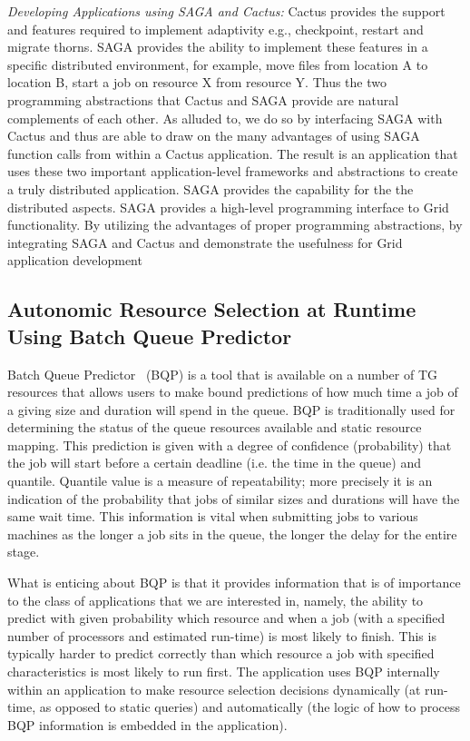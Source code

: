 \documentclass{sig-alternate}
\newcommand{\up}{\vspace*{-0.3em}}
\begin{document}
{\it Developing Applications using SAGA and Cactus:} Cactus provides
the support and features required to implement adaptivity e.g.,
checkpoint, restart and migrate thorns. SAGA provides the ability to
implement these features in a specific distributed environment, for
example, move files from location A to location B, start a job on
resource X from resource Y.  Thus the two programming abstractions
that Cactus and SAGA provide are natural complements of each other.
As alluded to, we do so by interfacing SAGA with Cactus and thus are
able to draw on the many advantages of using SAGA function calls from
within a Cactus application.  The result is an application that uses
these two important application-level frameworks and abstractions to
create a truly distributed application.  SAGA provides the capability
for the the distributed aspects. SAGA provides a high-level
programming interface to Grid functionality. By utilizing the
advantages of proper programming abstractions, by integrating SAGA and
Cactus and demonstrate the usefulness for Grid application development

\up\up
\subsection{Autonomic Resource Selection at Runtime Using Batch Queue
  Predictor}
Batch Queue Predictor~\cite{bqp, bqp_url} (BQP) is a tool that is
available on a number of TG resources that allows users to make
bound predictions of how much time a job of a giving size and duration
will spend in the queue.  BQP is traditionally used for determining
the status of the queue resources available and static resource
mapping. This prediction is given with a degree of confidence
(probability) that the job will start before a certain deadline
(i.e. the time in the queue) and quantile. Quantile value is a measure
of repeatability; more precisely it is an indication of the
probability that jobs of similar sizes and durations will have the
same wait time. This information is vital when submitting jobs to
various machines as the longer a job sits in the queue, the longer the
delay for the entire stage.

What is enticing about BQP is that it provides information that is of
importance to the class of applications that we are interested in,
namely, the ability to predict with given probability which resource
and when a job (with a specified number of processors and estimated
run-time) is most likely to finish.  This is typically harder to
predict correctly than which resource a job with specified
characteristics is most likely to run first.  The application uses BQP
internally within an application to make resource selection decisions
dynamically (at run-time, as opposed to static queries) and
automatically (the logic of how to process BQP information is embedded
in the application).
\end{document}
